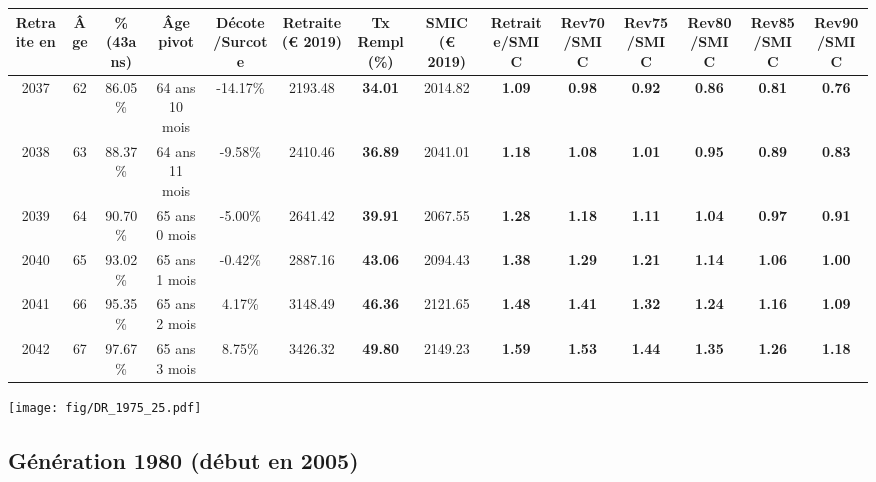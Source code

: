 \begin{adjustbox}{max width=\textwidth} 
\begin{tabular}[htb]{|c|c||c|c|c||c|c||c||c|c|c|c|c|c|} 
\hline 
 Retraite en &  Âge &  \%(43ans) &  Âge pivot &  Décote/Surcote &  Retraite (\euro{} 2019) &  Tx Rempl(\%) &  SMIC (\euro{} 2019) &  Retraite/SMIC &  Rev70/SMIC &  Rev75/SMIC &  Rev80/SMIC &  Rev85/SMIC &  Rev90/SMIC \\ 
\hline \hline 
 2037 &  62 &  86.05\% &  64 ans 10 mois &  -14.17\% &  2193.48 &  {\bf 34.01} &  2014.82 &  {\bf 1.09} &  {\bf {\color{red} 0.98}} &  {\bf {\color{red} 0.92}} &  {\bf {\color{red} 0.86}} &  {\bf {\color{red} 0.81}} &  {\bf {\color{red} 0.76}} \\ 
\hline 
 2038 &  63 &  88.37\% &  64 ans 11 mois &  -9.58\% &  2410.46 &  {\bf 36.89} &  2041.01 &  {\bf 1.18} &  {\bf 1.08} &  {\bf 1.01} &  {\bf {\color{red} 0.95}} &  {\bf {\color{red} 0.89}} &  {\bf {\color{red} 0.83}} \\ 
\hline 
 2039 &  64 &  90.70\% &  65 ans 0 mois &  -5.00\% &  2641.42 &  {\bf 39.91} &  2067.55 &  {\bf 1.28} &  {\bf 1.18} &  {\bf 1.11} &  {\bf 1.04} &  {\bf {\color{red} 0.97}} &  {\bf {\color{red} 0.91}} \\ 
\hline 
 2040 &  65 &  93.02\% &  65 ans 1 mois &  -0.42\% &  2887.16 &  {\bf 43.06} &  2094.43 &  {\bf 1.38} &  {\bf 1.29} &  {\bf 1.21} &  {\bf 1.14} &  {\bf 1.06} &  {\bf {\color{red} 1.00}} \\ 
\hline 
 2041 &  66 &  95.35\% &  65 ans 2 mois &  4.17\% &  3148.49 &  {\bf 46.36} &  2121.65 &  {\bf 1.48} &  {\bf 1.41} &  {\bf 1.32} &  {\bf 1.24} &  {\bf 1.16} &  {\bf 1.09} \\ 
\hline 
 2042 &  67 &  97.67\% &  65 ans 3 mois &  8.75\% &  3426.32 &  {\bf 49.80} &  2149.23 &  {\bf 1.59} &  {\bf 1.53} &  {\bf 1.44} &  {\bf 1.35} &  {\bf 1.26} &  {\bf 1.18} \\ 
\hline 
\hline 
\end{tabular} 
\end{adjustbox} 
 
 \vspace{0.1cm} 

 \begin{center}\texttt{[image: fig/DR\_1975\_25.pdf]}\end{center} \label{fig/DR_1975_25.pdf} 

\newpage 
 
\subsection{Génération 1980 (début en 2005)} 

